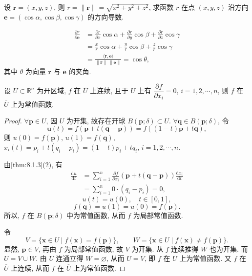 \begin{example}\label{ex:8.1.13}
设 $\boldsymbol{r} = (x, y, z)$, 则 $r = \|\boldsymbol{r}\| = \sqrt{x^{2} + y^{2} + z^{2}}$, 求函数 $r$ 在点 $(x, y, z)$ 沿方向 $\boldsymbol{e} = (\cos\alpha, \cos\beta, \cos\gamma)$ 的方向导数.

\begin{solution}
\begin{align*}
  \frac{\partial r}{\partial \boldsymbol{e}}
  &= \frac{\partial r}{\partial x}\cos\alpha + \frac{\partial r}{\partial y}\cos\beta + \frac{\partial r}{\partial z}\cos\gamma \\
  &= \frac{x}{r}\cos\alpha + \frac{y}{r}\cos\beta + \frac{z}{r}\cos\gamma \\
  &= \frac{\langle \boldsymbol{r}, \boldsymbol{e} \rangle}{\|\boldsymbol{r}\|\,\|\boldsymbol{e}\|} = \cos\theta,
\end{align*}
其中 $\theta$ 为向量 $\boldsymbol{r}$ 与 $\boldsymbol{e}$ 的夹角.\qedhere
\end{solution}
\end{example}

\begin{theorem}\label{thm:8.1.6}
设 $U \subset \mathbb{R}^{n}$ 为开区域, $f$ 在 $\overline{U}$ 上连续, 且于 $U$ 上有 $\dfrac{\partial f}{\partial x_{i}} = 0$, $i = 1, 2, \cdots, n$, 则 $f$ 在 $\overline{U}$ 上为常值函数.
\end{theorem}

\begin{proof}
$\forall \boldsymbol{p} \in U$, 因 $U$ 为开集, 故存在开球 $B(\boldsymbol{p}; \delta) \subset U$. $\forall \boldsymbol{q} \in B(\boldsymbol{p}; \delta)$, 令
\[
  \boldsymbol{u}(t) = f(\boldsymbol{p} + t(\boldsymbol{q} - \boldsymbol{p})) = f((1 - t)\boldsymbol{p} + t\boldsymbol{q}),
\]
则 $u(0) = f(\boldsymbol{p})$, $u(1) = f(\boldsymbol{q})$, $x_{i}(t) = p_{i} + t(q_{i} - p_{i}) = (1 - t)p_{i} + tq_{i}$, $i = 1, 2, \cdots, n$.

由\cref{thm:8.1.3}(2), 有
\begin{align*}
  \frac{\mathrm{d}u}{\mathrm{d}t}
  &= \sum_{i = 1}^{n}\frac{\partial f}{\partial x_{i}}(\boldsymbol{p} + t(\boldsymbol{q} - \boldsymbol{p}))\frac{\mathrm{d}x_{i}}{\mathrm{d}t} \\
  &= \sum_{i = 1}^{n} 0 \cdot (q_{i} - p_{i}) = 0,
\end{align*}
\[
  u(t) = u(0), \quad t \in [0, 1],
\]
\[
  f(\boldsymbol{q}) = u(1) = u(0) = f(\boldsymbol{p}).
\]
所以, $f$ 在 $B(\boldsymbol{p}; \delta)$ 中为常值函数, 从而 $f$ 为局部常值函数.

令
\[
  V = \{\boldsymbol{x} \in U \mid f(\boldsymbol{x}) = f(\boldsymbol{p})\}, \qquad W = \{\boldsymbol{x} \in U \mid f(\boldsymbol{x}) \neq f(\boldsymbol{p})\}.
\]
显然, $\boldsymbol{p} \in V$, 再由 $f$ 为局部常值函数, 故 $V$ 为开集. 从 $f$ 连续推得 $W$ 也为开集. 而 $U = V \cup W$. 由 $U$ 连通立得 $W = \varnothing$, 从而 $U = V$, 即 $f$ 在 $U$ 上为常值函数. 又 $f$ 在 $\overline{U}$ 上连续, 从而 $f$ 在 $\overline{U}$ 上为常值函数.\qedhere
\end{proof}

